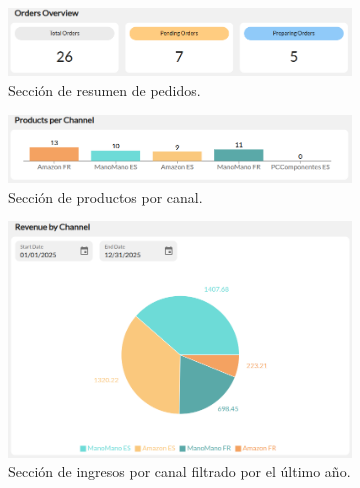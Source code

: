 \begin{figure}[H]
    \centering
    \begin{subfigure}{0.48\linewidth}
        \centering
        \includegraphics[width=\linewidth]{figures/design_develop/screenshots/dash_sec1.png}
        \caption{Sección de resumen de pedidos.}
    \end{subfigure}
    \hfill
    \begin{subfigure}{0.48\linewidth}
        \centering
        \includegraphics[width=\linewidth]{figures/design_develop/screenshots/dash_sec2.png}
        \caption{Sección de productos por canal.}
    \end{subfigure}
    \begin{subfigure}{0.48\linewidth}
        \centering
        \includegraphics[width=\linewidth]{figures/design_develop/screenshots/dash_sec3.png}
        \caption{Sección de ingresos por canal filtrado por el último año.}
    \end{subfigure}
    \hfill
    \begin{subfigure}{0.48\linewidth}
        \centering

\end{subfigure}
\end{figure}

